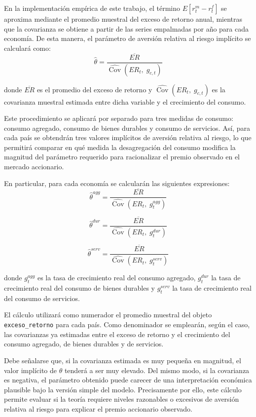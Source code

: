 \documentclass{article}\usepackage[]{graphicx}\usepackage[]{xcolor}
\begin{document}
En la implementación empírica de este trabajo, el término \(E[r^m_t - r^f_t]\) se aproxima mediante el promedio muestral del exceso de retorno anual, mientras que la covarianza se obtiene a partir de las series empalmadas por año para cada economía. De esta manera, el parámetro de aversión relativa al riesgo implícito se calculará como:
\[
\hat{\theta} = \frac{\overline{ER}}{\widehat{\operatorname{Cov}}(ER_t,\; g_{c,t})}
\]

donde \(\overline{ER}\) es el promedio del exceso de retorno y \(\widehat{\operatorname{Cov}}(ER_t,\; g_{c,t})\) es la covarianza muestral estimada entre dicha variable y el crecimiento del consumo.

Este procedimiento se aplicará por separado para tres medidas de consumo: consumo agregado, consumo de bienes durables y consumo de servicios. Así, para cada país se obtendrán tres valores implícitos de aversión relativa al riesgo, lo que permitirá comparar en qué medida la desagregación del consumo modifica la magnitud del parámetro requerido para racionalizar el premio observado en el mercado accionario.

En particular, para cada economía se calcularán las siguientes expresiones:
\[
\hat{\theta}^{agg}=
\frac{\overline{ER}}
{\widehat{\operatorname{Cov}}(ER_t,\; g^{agg}_{t})}
\]

\[
\hat{\theta}^{dur}=
\frac{\overline{ER}}
{\widehat{\operatorname{Cov}}(ER_t,\; g^{dur}_{t})}
\]

\[
\hat{\theta}^{serv}=
\frac{\overline{ER}}
{\widehat{\operatorname{Cov}}(ER_t,\; g^{serv}_{t})}
\]

donde \(g^{agg}_{t}\) es la tasa de crecimiento real del consumo agregado, \(g^{dur}_{t}\) la tasa de crecimiento real del consumo de bienes durables y \(g^{serv}_{t}\) la tasa de crecimiento real del consumo de servicios.

El cálculo utilizará como numerador el promedio muestral del objeto \texttt{exceso\_retorno} para cada país. Como denominador se emplearán, según el caso, las covarianzas ya estimadas entre el exceso de retorno y el crecimiento del consumo agregado, de bienes durables y de servicios.

Debe señalarse que, si la covarianza estimada es muy pequeña en magnitud, el valor implícito de \(\theta\) tenderá a ser muy elevado. Del mismo modo, si la covarianza es negativa, el parámetro obtenido puede carecer de una interpretación económica plausible bajo la versión simple del modelo. Precisamente por ello, este cálculo permite evaluar si la teoría requiere niveles razonables o excesivos de aversión relativa al riesgo para explicar el premio accionario observado.
\end{document}
